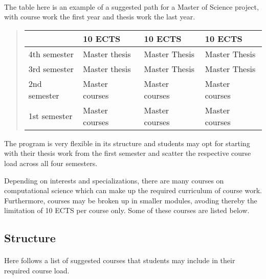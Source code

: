 \documentclass[%
twoside,                 %
final,                   %
10pt]{article}
\begin{document}
\paragraph{}
The table here is an example of a suggested path for a Master of Science project,
with course work the first year and thesis work the last year.


\begin{quote}
\begin{tabular}{llll}
\hline
\multicolumn{1}{l}{  } & \multicolumn{1}{l}{ 10 ECTS } & \multicolumn{1}{l}{ 10 ECTS } & \multicolumn{1}{l}{ 10 ECTS } \\
\hline
4th semester & Master thesis  & Master Thesis  & Master Thesis  \\
\hline
3rd semester & Master thesis  & Master Thesis  & Master Thesis  \\
\hline
2nd semester & Master courses & Master courses & Master courses \\
\hline
1st semester & Master courses & Master courses & Master courses \\
\hline
\end{tabular}
\end{quote}

\noindent
The program is very flexible in its structure and students may opt for starting with their thesis
work from the first semester and scatter the respective course load across all four semesters.

Depending on interests and specializations, there are many courses on computational science which can make
up the required curriculum of course work. Furthermore, courses may be broken up in smaller modules,
avoding thereby the limitation of 10 ECTS per course only. Some of these courses are listed below.




\subsection*{Structure}

\paragraph{}
Here follows a list of suggested courses that students may include in their required course load.
\end{document}
